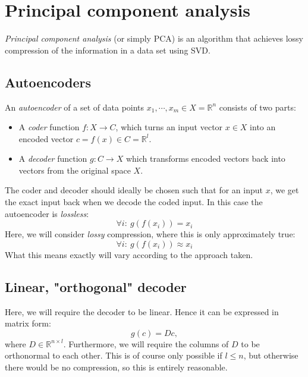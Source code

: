 \documentclass[12pt, a4paper]{article}
\numberwithin{equation}{section}
\begin{document}
\section{Principal component analysis}
\textit{Principal component analysis} (or simply PCA) is an algorithm that achieves lossy compression of the information in a data set using SVD.

\subsection{Autoencoders}
An \textit{autoencoder} of a set of data points $x_1,\cdots, x_m\in X=\mathbb{R}^n$ consists of two parts:
\begin{itemize}
\item A \textit{coder} function $f: X\rightarrow C$, which turns an input vector $x\in X$ into an encoded vector $c=f(x)\in C=\mathbb{R}^l$.
\item A \textit{decoder} function $g: C\rightarrow X$ which transforms encoded vectors back into vectors from the original space $X$.
\end{itemize}
The coder and decoder should ideally be chosen such that for an input $x$, we get the exact input back when we decode the coded input. In this case the autoencoder is \textit{lossless}:
\begin{equation}
\forall i:\ g(f(x_i))=x_i
\end{equation}
Here, we will consider \textit{lossy} compression, where this is only approximately true:
\begin{equation}
\forall i:\ g(f(x_i))\approx x_i
\end{equation} 
What this means exactly will vary according to the approach taken.

\subsection{Linear, "orthogonal" decoder}
Here, we will require the decoder to be linear. Hence it can be expressed in matrix form:
\begin{equation}
g(c)=Dc,
\end{equation}
where $D\in\mathbb{R}^{n\times l}$. Furthermore, we will require the columns of $D$ to be orthonormal to each other. This is of course only possible if $l\le n$, but otherwise there would be no compression, so this is entirely reasonable.
\end{document}

